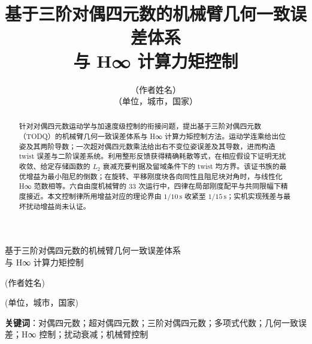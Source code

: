\documentclass[11pt,a4paper]{article}
\title{基于三阶对偶四元数的机械臂几何一致误差体系\\
       与 H∞ 计算力矩控制}
\author{（作者姓名）\\（单位，城市，国家）}
\date{}
\begin{document}
\thispagestyle{fancy}

\begin{center}
  {\LARGE 基于三阶对偶四元数的机械臂几何一致误差体系\\[0.35em]
          与 H∞ 计算力矩控制\par}
  \vspace{0.9em}
  {(作者姓名)\par}
  {(单位，城市，国家)\par}
  \vspace{0.9em}
\end{center}

\begin{abstract}
\noindent
针对对偶四元数运动学与加速度级控制的衔接问题，提出基于三阶对偶四元数（TODQ）的机械臂几何一致误差体系与 H∞ 计算力矩控制方法。运动学连乘给出位姿及其两阶导数；一次超对偶四元数乘法给出右不变位姿误差及其导数，进而构造 twist 误差与二阶误差系统。利用整形反馈获得精确耗散等式，在相应假设下证明无扰收敛、给定存储函数的 $L_2$ 衰减充要判据及留域条件下的 twist 均方界。该证书族的最优增益为最小阻尼的倒数；在旋转、平移刚度块各向同性且阻尼块对角时，与线性化 H∞ 范数相等。六自由度机械臂的 33 次运行中，四律在局部刚度配平与共同限幅下精度接近。本文控制律所用增益对应的理论界由 $1/10\,\mathrm{s}$ 收紧至 $1/15\,\mathrm{s}$；实机实现残差与最坏扰动增益尚未认证。
\end{abstract}

\medskip
\noindent\textbf{关键词}：对偶四元数；超对偶四元数；三阶对偶四元数；多项式代数；几何一致误差；H∞ 控制；扰动衰减；机械臂控制

\bigskip










\end{document}
